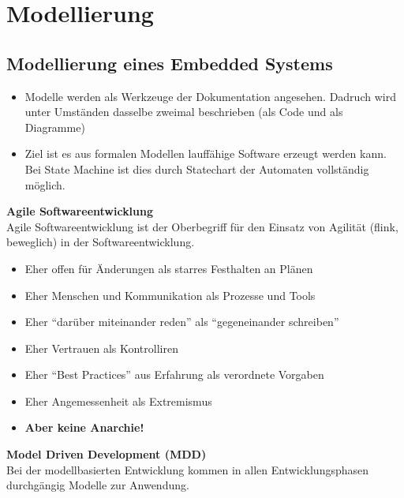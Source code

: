 \section{Modellierung }
\subsection{Modellierung eines Embedded Systems }

\begin{itemize}
	\item Modelle werden als Werkzeuge der Dokumentation angesehen. Dadruch 
	wird unter Umständen dasselbe zweimal beschrieben (als Code und als Diagramme)
	
	\item Ziel ist es aus formalen Modellen lauffähige Software erzeugt werden kann. Bei 
	State Machine ist dies durch Statechart der Automaten vollständig möglich.
\end{itemize}

\textbf{Agile Softwareentwicklung}\\
Agile Softwareentwicklung ist der Oberbegriff für den Einsatz von Agilität (flink, beweglich) in der Softwareentwicklung.
\begin{itemize}
	\item Eher offen für Änderungen als starres Festhalten an Plänen
	\item Eher Menschen und Kommunikation als Prozesse und Tools
	\item Eher "`darüber miteinander reden"' als "`gegeneinander schreiben"'
	\item Eher Vertrauen als Kontrolliren
	\item Eher "`Best Practices"' aus Erfahrung als verordnete Vorgaben
	\item Eher Angemessenheit als Extremismus
	\item \textbf{Aber keine Anarchie!}
\end{itemize} 


\textbf{Model Driven Development (MDD)}\\
Bei der modellbasierten Entwicklung kommen in allen Entwicklungsphasen durchgängig Modelle zur Anwendung.

